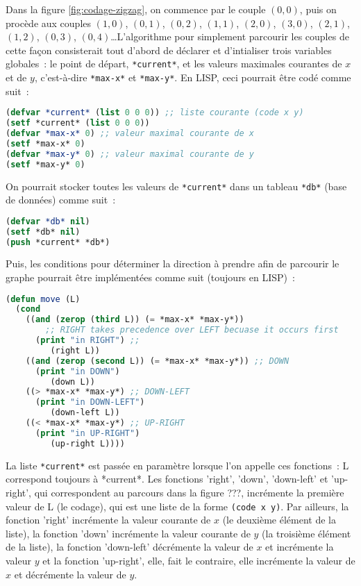 \documentclass{article}
\begin{document}

Dans la figure \ref{fig:codage-zigzag}, on commence par le couple $(0,0)$, puis on procède aux couples $(1,0)$, $(0,1)$, $(0,2)$, $(1,1)$, $(2,0)$, $(3,0)$, $(2,1)$, $(1,2)$, $(0,3)$, $(0,4)$\ldots L'algorithme pour simplement parcourir les couples de cette façon consisterait tout d'abord de déclarer et d'intialiser trois variables globales~: le point de départ, \lstinline!*current*!, et les valeurs maximales courantes de $x$ et de $y$, c'est-à-dire \lstinline!*max-x*! et \lstinline!*max-y*!. En LISP, ceci pourrait être codé comme suit~:

\begin{lstlisting}[language=Lisp]
(defvar *current* (list 0 0 0)) ;; liste courante (code x y)
(setf *current* (list 0 0 0)) 
(defvar *max-x* 0) ;; valeur maximal courante de x
(setf *max-x* 0)
(defvar *max-y* 0) ;; valeur maximal courante de y
(setf *max-y* 0)
\end{lstlisting}

On pourrait stocker toutes les valeurs de \lstinline!*current*! dans un tableau \lstinline!*db*! (base de données) comme suit~:

\begin{lstlisting}[language=Lisp]
(defvar *db* nil) 
(setf *db* nil)
(push *current* *db*)
\end{lstlisting}

Puis, les conditions pour déterminer la direction à prendre afin de parcourir le graphe pourrait être implémentées comme suit (toujours en LISP)~:

\begin{lstlisting}[language=Lisp]
(defun move (L)
  (cond
    ((and (zerop (third L)) (= *max-x* *max-y*)) 
		;; RIGHT takes precedence over LEFT becuase it occurs first
      (print "in RIGHT") ;; 
         (right L))
    ((and (zerop (second L)) (= *max-x* *max-y*)) ;; DOWN
      (print "in DOWN") 
         (down L))
    ((> *max-x* *max-y*) ;; DOWN-LEFT
      (print "in DOWN-LEFT")  
         (down-left L))
    ((< *max-x* *max-y*) ;; UP-RIGHT
      (print "in UP-RIGHT") 
         (up-right L))))
\end{lstlisting}
 
La liste \lstinline!*current*! est passée en paramètre lorsque l'on appelle ces fonctions~: L correspond toujours à *current*. Les fonctions 'right', 'down', 'down-left' et 'up-right', qui correspondent au parcours dans la figure ???, incrémente la première valeur de L (le codage), qui est une liste de la forme \lstinline!(code x y)!. Par ailleurs, la fonction 'right' incrémente la valeur courante de $x$ (le deuxième élément de la liste), la fonction 'down' incrémente la valeur courante de $y$ (la troisième élément de la liste), la fonction 'down-left' décrémente la valeur de $x$ et incrémente la valeur $y$ et la fonction 'up-right', elle, fait le contraire, elle incrémente la valeur de $x$ et décrémente la valeur de $y$. 
\end{document}
